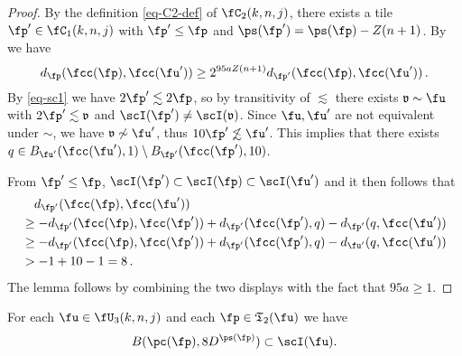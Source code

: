 \begin{proof}
    By the definition \eqref{eq-C2-def} of $\fC_2(k,n,j)$, there exists a tile $\fp' \in \fC_1(k,n,j)$ with $\fp' \le \fp$ and $\ps(\fp') = \ps(\fp)- Z(n+1)$.
    By  we have
    $$
        d_{\fp}(\fcc(\fp), \fcc(\fu')) \ge 2^{95a Z(n+1)} d_{\fp'}(\fcc(\fp), \fcc(\fu'))\,.
    $$
    By \eqref{eq-sc1} we have $2\fp' \lesssim 2\fp$, so by transitivity of $\lesssim$ there exists $\mathfrak{v} \sim \fu$ with $2\fp' \lesssim \mathfrak{v}$ and $\scI(\fp') \ne \scI(\mathfrak{v})$. Since $\fu, \fu'$ are not equivalent under $\sim$, we have $\mathfrak{v} \not \sim \fu'$, thus $10\fp' \not\lesssim \fu'$. This implies that there exists $q \in B_{\fu'}(\fcc(\fu'), 1) \setminus B_{\fp'}(\fcc(\fp'), 10)$.

    From $\fp' \le \fp$, $\scI(\fp') \subset \scI(\fp) \subset \scI(\fu')$ and  it then follows that
    \begin{align*}
        &\quad d_{\fp'}(\fcc(\fp), \fcc(\fu'))\\
        &\ge -d_{\fp'}(\fcc(\fp), \fcc(\fp')) + d_{\fp'}(\fcc(\fp'), q) - d_{\fp'}(q, \fcc(\fu'))\\
        &\ge -d_{\fp'}(\fcc(\fp), \fcc(\fp')) + d_{\fp'}(\fcc(\fp'), q) - d_{\fu'}(q, \fcc(\fu'))\\
        &> -1 + 10 - 1 = 8\,.
    \end{align*}
    The lemma follows by combining the two displays with the fact that $95 a \ge 1$.
\end{proof}

\begin{lemma}
    \label{forest-inner}
    For each $\fu\in \fU_3(k,n,j)$
    and each $\fp \in \mathfrak{T}_2(\fu)$
    we have
    \begin{equation}
        B(\pc(\fp), 8 D^{\ps(\fp)}) \subset \scI(\fu).
    \end{equation}
\end{lemma}

